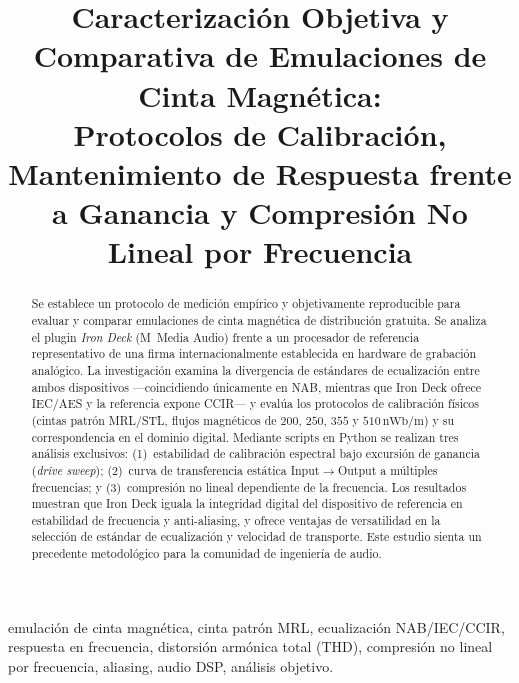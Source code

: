 \documentclass[10pt,conference]{IEEEtran}
\begin{document}
\title{Caracterización Objetiva y Comparativa de Emulaciones de Cinta Magnética: \\
Protocolos de Calibración, Mantenimiento de Respuesta frente a Ganancia y Compresión No Lineal por Frecuencia}

\author{
}

\maketitle

\begin{abstract}
Se establece un protocolo de medición empírico y objetivamente reproducible para evaluar y
comparar emulaciones de cinta magnética de distribución gratuita. Se analiza el plugin
\emph{Iron Deck} (M~Media Audio) frente a un procesador de referencia representativo de
una firma internacionalmente establecida en hardware de grabación analógico.
La investigación examina la divergencia de estándares de ecualización entre ambos dispositivos
—coincidiendo únicamente en NAB, mientras que Iron Deck ofrece IEC/AES y la referencia expone
CCIR— y evalúa los protocolos de calibración físicos (cintas patrón MRL/STL, flujos magnéticos
de $200$, $250$, $355$ y $510\,\text{nWb/m}$) y su correspondencia en el dominio digital.
Mediante scripts en Python se realizan tres análisis exclusivos: (1)~estabilidad de calibración
espectral bajo excursión de ganancia (\emph{drive sweep}); (2)~curva de transferencia estática
Input$\to$Output a múltiples frecuencias; y (3)~compresión no lineal dependiente de la frecuencia.
Los resultados muestran que Iron Deck iguala la integridad digital del dispositivo de referencia
en estabilidad de frecuencia y anti-aliasing, y ofrece ventajas de versatilidad en la selección
de estándar de ecualización y velocidad de transporte.
Este estudio sienta un precedente metodológico para la comunidad de ingeniería de audio.
\end{abstract}

\begin{IEEEkeywords}
emulación de cinta magnética, cinta patrón MRL, ecualización NAB/IEC/CCIR, respuesta en
frecuencia, distorsión armónica total (THD), compresión no lineal por frecuencia, aliasing,
audio DSP, análisis objetivo.
\end{IEEEkeywords}
\end{document}
